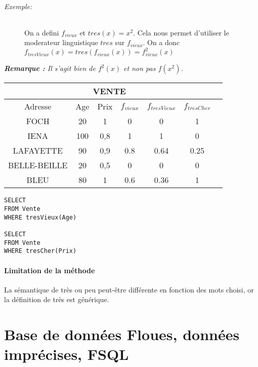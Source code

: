 \documentclass[a4paper,11pt]{article}
\begin{document}
\paragraph{Exemple:}
\begin{center}
		\begin{figure}[!h]
			\centering
			
			\caption{}{On a defini  $f_{vieux}$ et $tres(x)=x^2$. Cela nous permet d'utiliser le moderateur linguistique $ tres$ sur $f_{vieux}$. On a donc $f_{tresVieux}(x)=tres(f_{vieux}(x))=f_{vieux}^2(x)$}
		\end{figure}				
\end{center}
\emph{\textbf{Remarque : }Il s'agit bien de $f^2(x)$ et non pas $f(x^2)$.}
\begin{center}
\begin{tabular}{|c|c|c|c|c|c|c|}
	\hline
	\multicolumn{6}{|c|}{\textbf{VENTE}} \\
	\hline
	\hline 
	Adresse & Age & Prix & $f_{vieux}$ & $f_{tresVieux}$ & $f_{tresCher}$ \\ 
	\hline 
	\hline
	FOCH & 20 & 1 & 0 & 0 & 1\\ 
	\hline 
	IENA & 100 & 0,8 & 1 & 1 & 0\\ 
	\hline 
	LAFAYETTE & 90 & 0,9 & 0.8 & 0.64 & 0.25\\ 
	\hline 
	BELLE-BEILLE & 20 & 0,5 & 0 & 0 & 0\\ 
	\hline 
	BLEU & 80 & 1 & 0.6 & 0.36 & 1\\ 
	\hline 
\end{tabular} 
\end{center}
\begin{lstlisting}[mathescape]
SELECT
FROM Vente
WHERE tresVieux(Age)

SELECT
FROM Vente
WHERE tresCher(Prix)

\end{lstlisting}

\subsection{Limitation de la méthode}
La sémantique de \og{}très\fg{} ou \og{}peu\fg{} peut-être différente en fonction des mots choisi, or la définition de \og{}très\fg{} est générique.

\part{Base de données Floues, données imprécises, FSQL}
\end{document}
